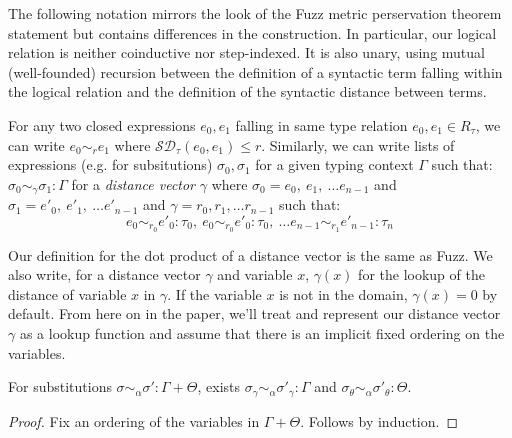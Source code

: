 The following notation mirrors the look of the Fuzz metric perservation theorem
statement but contains differences in the construction. In particular, our
logical relation is neither coinductive nor step-indexed. It is also unary,
using mutual (well-founded) recursion between the definition of a syntactic term
falling within the logical relation and the definition of the syntactic distance
between terms.

For any two closed expressions $e_0, e_1$ falling in same type relation $e_0,
e_1 \in R_\tau$, we can write $e_0 \sim_r e_1$ where $\mathcal{SD}_{\tau}(e_0,
e_1) \leq r$. Similarly, we can write lists of expressions (e.g. for
subsitutions) $\sigma_0, \sigma_1$ for a given typing context $\Gamma$ such
that: $\sigma_0 \sim_{\gamma} \sigma_1 : \Gamma$ for a \textit{distance vector}
$\gamma$
where
$\sigma_0 = e_0,~e_1,~\ldots e_{n-1}$ 
and $\sigma_1 = e'_0,~e'_1,~\ldots e'_{n-1}$ 
and $\gamma = r_0, r_1, \ldots r_{n-1}$ such that:
$$e_0 \sim_{r_0} e'_0 : \tau_0,~e_0 \sim_{r_0} e'_0 : \tau_0,~\ldots e_{n-1}
\sim_{r_1} e'_{n-1} : \tau_n$$

Our definition for the dot product of a distance vector is the same as Fuzz. We
also write, for a distance vector $\gamma$ and variable $x$, $\gamma(x)$ for the
lookup of the distance of variable $x$ in $\gamma$. If the variable $x$ is not
in the domain, $\gamma(x) = 0$ by default. From here on in the paper, we'll
treat and represent our distance vector $\gamma$ as a lookup function and assume
that there is an implicit fixed ordering on the variables.

%
\begin{lemma}
  \label{thm:sub-decomp}
  For substitutions $\sigma \sim_{\alpha} \sigma' : \Gamma + \Theta$,
  exists
  $\sigma_{\gamma} \sim_{\alpha} \sigma'_{\gamma} : \Gamma$
  and
  $\sigma_{\theta} \sim_{\alpha} \sigma'_{\theta} : \Theta$.
\end{lemma}
\begin{proof}
  Fix an ordering of the variables in $\Gamma + \Theta$. Follows by induction.
\end{proof}

